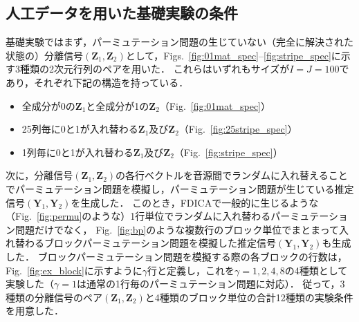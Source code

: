 \subsection{人工データを用いた基礎実験の条件}
\label{sec:ex_condition_matrix}
基礎実験ではまず，パーミュテーション問題の生じていない（完全に解決された状態の）分離信号$(\bm{Z}_1, \bm{Z}_2)$として，Figs.~\ref{fig:01mat_spec}--\ref{fig:stripe_spec}に示す3種類の2次元行列のペアを用いた．
これらはいずれもサイズが$I=J=100$であり，それぞれ下記の構造を持っている．
\begin{itemize}
  \item 全成分が0の$\bm{Z}_1$と全成分が1の$\bm{Z}_2$（Fig.~\ref{fig:01mat_spec}）
  \item 25列毎に0と1が入れ替わる$\bm{Z}_1$及び$\bm{Z}_2$（Fig.~\ref{fig:25stripe_spec}）
  \item 1列毎に0と1が入れ替わる$\bm{Z}_1$及び$\bm{Z}_2$（Fig.~\ref{fig:stripe_spec}）
\end{itemize}
次に，分離信号$(\bm{Z}_1, \bm{Z}_2)$の各行ベクトルを音源間でランダムに入れ替えることでパーミュテーション問題を模擬し，パーミュテーション問題が生じている推定信号$(\bm{Y}_1, \bm{Y}_2)$を生成した．
このとき，FDICAで一般的に生じるような（Fig.~\ref{fig:permu}のような）1行単位でランダムに入れ替わるパーミュテーション問題だけでなく，
Fig.~\ref{fig:bp}のような複数行のブロック単位でまとまって入れ替わるブロックパーミュテーション問題を模擬した推定信号$(\bm{Y}_1, \bm{Y}_2)$も生成した．
ブロックパーミュテーション問題を模擬する際の各ブロックの行数は，Fig.~\ref{fig:ex_block}に示すように$\gamma$行と定義し，これを$\gamma=1, 2, 4, 8$の4種類として実験した（$\gamma=1$は通常の1行毎のパーミュテーション問題に対応）．
従って，3種類の分離信号のペア$(\bm{Z}_1, \bm{Z}_2)$と4種類のブロック単位の合計12種類の実験条件を用意した．

